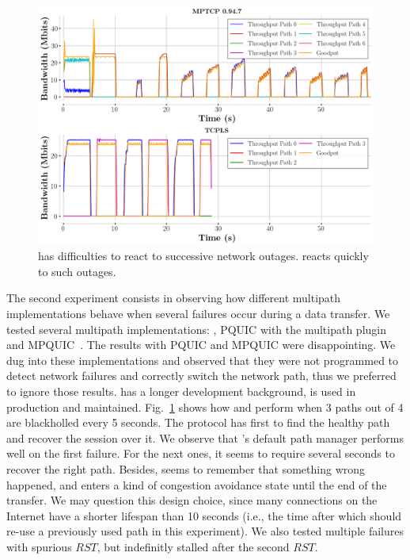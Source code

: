 \begin{figure}[!t]
  \begin{center}
    \includegraphics[width=\columnwidth]{figures/tcpls_mptcp.png}
  \end{center}
\vspace{-0.5cm}
  \caption{\mptcp has difficulties to react to successive network outages. \tcpls reacts quickly to such outages.}
  \label{fig:failover}
\end{figure}

The second experiment consists in observing how different multipath
implementations behave when several failures occur during a data transfer. We
tested several multipath implementations: \mptcp, PQUIC with the multipath
plugin~\cite{de2019pluginizing} and MPQUIC~\cite{de2017multipath}.
The results with PQUIC and MPQUIC were disappointing.
We dug into these implementations and observed that they were not programmed
to detect network failures and correctly switch the network path, thus we
preferred to ignore those results. \mptcp has a longer development
background, is used in production and maintained. Fig.~\ref{fig:failover}
shows how \mptcp and \tcpls perform when 3 paths out of 4 are blackholled every
5 seconds. The protocol has first to find the healthy path and recover the
session over it. We observe that \mptcp's default path manager performs well on the first
failure. For the next ones, it seems to require several seconds to
recover the right path. Besides, \mptcp seems to remember that something wrong happened,
and enters a kind of congestion avoidance state until the end of the transfer. We
may question this design choice, since many \tcp connections on the Internet have
a shorter lifespan than 10 seconds (i.e., the time after which \mptcp should
re-use a previously used path in this experiment). We also tested multiple
failures with spurious $RST$, but \mptcp indefinitly stalled after the second $RST$.

